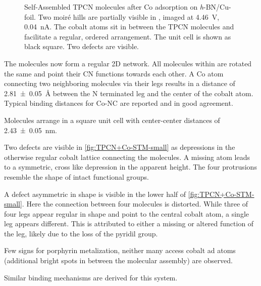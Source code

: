 \begin{figure}[!h]
{	  	\label{fig:TPCN+Co-STM-small-model}
  	}
  	\caption{Self-Assembled TPCN molecules after Co adsorption on \textit{h}-BN/Cu-foil. Two moir\'e hills are partially visible in , imaged at \SI{4.46}{\volt}, \SI{0.04}{\nano\ampere}.  The cobalt atoms sit in between the TPCN molecules and facilitate a regular, ordered arrangement. The unit cell is shown as black square. Two defects are visible.}
  	\label{fig:TPCN+Co-STM}
  \end{figure}
 
The molecules now form a regular 2D network. All molecules within are rotated the same and point their CN functions towards each other. A Co atom connecting two neighboring molecules via their legs results in a distance of \SI{2.81 \pm 0.05}{\angstrom} between the N terminated leg and the center of the cobalt atom. Typical binding distances for Co-NC are reported \cite{schlickum_metalorganic_2007, przychodzen_supramolecular_2006} and in good agreement.

Molecules arrange in a square unit cell with center-center distances of \SI{2.43 \pm 0.05}{\nano \meter}.  

Two defects are visible in \autoref{fig:TPCN+Co-STM-small} as depressions in the otherwise regular cobalt lattice connecting the molecules. A missing atom leads to a symmetric, cross like depression in the apparent height. The four protrusions resemble the shape of intact functional groups.

A defect asymmetric in shape is visible in the lower half of \autoref{fig:TPCN+Co-STM-small}. Here the connection between four molecules is distorted. While three of four legs appear regular in shape and point to the central cobalt atom, a single leg appears different. This is attributed to either a missing or altered function of the leg, likely due to the loss of the pyridil group.

Few signs for porphyrin metalization, neither many access cobalt ad atoms (additional bright spots in between the molecular assembly) are observed. 

Similar binding mechanisms are derived for this system.\cite{urgel_controlling_2015}



  
